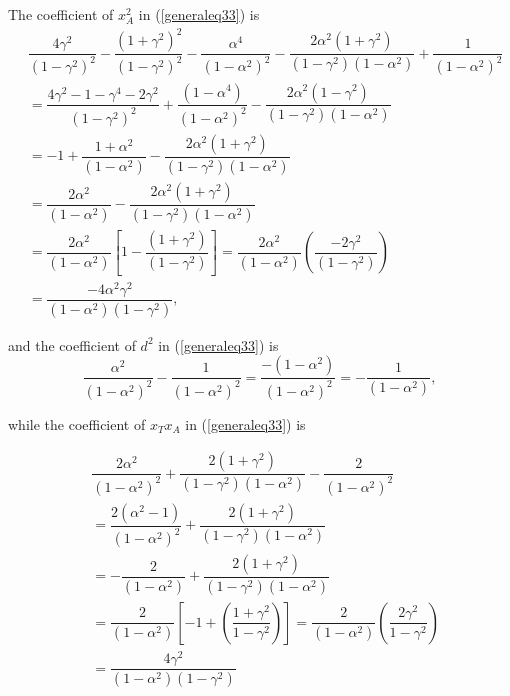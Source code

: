 The coefficient of $x_A^2$ in (\ref{generaleq33}) is
\begin{equation}
\begin{split}
&\dfrac{4\gamma^{2}}{(1-\gamma^{2})^{2}}-\dfrac{(1+\gamma^{2})^{2}}{(1-\gamma^{2})^{2}}-\dfrac{\alpha^{4}}{(1-\alpha^{2})^{2}}-\dfrac{2\alpha^{2}(1+\gamma^{2})}{(1-\gamma^{2})(1-\alpha^{2})}+\dfrac{1}{(1-\alpha^{2})^{2}}\\
&=\dfrac{4\gamma^{2}-1-\gamma^{4}-2\gamma^2}{(1-\gamma^2)^2} + \dfrac{(1-\alpha^4)}{(1-\alpha^2)^2} - \dfrac{2\alpha^{2}(1-\gamma^2)}{(1-\gamma^2)(1-\alpha^2)}\\
&=-1 + \dfrac{1+\alpha^2}{(1-\alpha^2)}- \dfrac{2 \alpha^2 (1+\gamma^2)}{(1-\gamma^2)(1-\alpha^2)}\\
&= \dfrac{2\alpha^2}{(1-\alpha^2)} - \dfrac{2 \alpha^2 (1+\gamma^2)}{(1-\gamma^2)(1-\alpha^2)}\\
&= \dfrac{2 \alpha^2}{(1-\alpha^2)}[1-\dfrac{(1+\gamma^2)}{(1-\gamma^2)}] = \dfrac{2\alpha^2}{(1-\alpha^2)}(\dfrac{-2\gamma^2}{(1-\gamma^2)})\\
&= \dfrac{-4 \alpha^{2} \gamma^2}{(1-\alpha^2)(1-\gamma^2)},
\end{split}
\end{equation}

and the coefficient of $d^2$ in (\ref{generaleq33}) is
\begin{equation}
\dfrac{\alpha^{2}}{(1-\alpha^{2})^{2}}- \dfrac{1}{(1-\alpha^{2})^{2}}
= \dfrac{-(1-\alpha^2)}{(1-\alpha^2)^2} = -\dfrac{1}{(1-\alpha^2)},
\end{equation}

while the coefficient of $x_T x_A$ in (\ref{generaleq33}) is 

\begin{equation}
\begin{split}
&\dfrac{2\alpha^{2}}{(1-\alpha^{2})^{2}}+\dfrac{2(1+\gamma^{2})}{(1-\gamma^{2})(1-\alpha^{2})}-\dfrac{2}{(1-\alpha^{2})^{2}}\\
&= \dfrac{2(\alpha^{2}-1)}{(1-\alpha^2)^2} + \dfrac{2(1+\gamma^2)}{(1-\gamma^2)(1-\alpha^2)}\\
&= -\dfrac{2}{(1-\alpha^2)} + \dfrac{2(1+\gamma^2)}{(1-\gamma^2)(1-\alpha^2)}\\
&=\dfrac{2}{(1-\alpha^2)}[-1 + (\dfrac{1+\gamma^2}{1-\gamma^2})] = \dfrac{2}{(1-\alpha^2)}(\dfrac{2\gamma^2}{1-\gamma^2})\\
&=\dfrac{4\gamma^2}{(1-\alpha^2)(1-\gamma^2)}
\end{split}
\end{equation}

